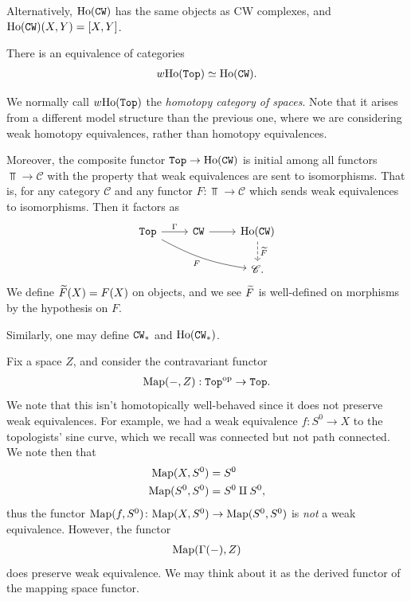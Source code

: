 \documentclass{article}[11pt]
\begin{document}
Alternatively, $\text{Ho}(\texttt{CW})$ has the same objects as CW complexes, and $\text{Ho}(\texttt{CW})(X,Y) = [X,Y]$.

\begin{exercise} There is an equivalence of categories
\begin{align*}
	w\text{Ho}(\texttt{Top}) \simeq \text{Ho}(\texttt{CW}).
\end{align*}
\end{exercise}

\begin{note} We normally call $w\text{Ho}(\texttt{Top})$ the \textit{homotopy category of spaces}. Note that it arises from a different model structure than the previous one, where we are considering weak homotopy equivalences, rather than homotopy equivalences.
\end{note}

Moreover, the composite functor $\texttt{Top} \to \text{Ho}(\texttt{CW})$ is initial among all functors $\Top \to \mathscr{C}$ with the property that weak equivalences are sent to isomorphisms. That is, for any category $\mathscr{C}$ and any functor $F: \Top \to \mathscr{C}$ which sends weak equivalences to isomorphisms. Then it factors as
\[
	\begin{tikzcd}
	\Top\rar["\Gamma"]\ar[drr,bend right=10,"F" below left] & \CW\rar & \Ho(\CW)\dar[dashed,"\til{F}" right]\\
	 &  & \mathscr{C}.
	\end{tikzcd}
\]
We define $\widetilde{F}(X) = F(X)$ on objects, and we see $\widetilde{F}$ is well-defined on morphisms by the hypothesis on $F$.

Similarly, one may define $\texttt{CW}_\ast$ and $\text{Ho}(\texttt{CW}_\ast)$.

Fix a space $Z$, and consider the contravariant functor
\begin{align*}
	\textup{Map}(-,Z) : \texttt{Top}^{\text{op}} \to \texttt{Top}.
\end{align*}
We note that this isn't homotopically well-behaved since it does not preserve weak equivalences. For example, we had a weak equivalence $f\colon S^0 \to X$ to the topologists' sine curve, which we recall was connected but not path connected. We note then that
\begin{align*}
	\textup{Map}(X,S^0) &= S^0 \\
	\textup{Map}(S^0, S^0) &= S^0 \amalg S^0,
\end{align*}
thus the functor $\textup{Map}(f,S^0) \colon \textup{Map}(X, S^0) \to \textup{Map}(S^0, S^0)$ is \textit{not} a weak equivalence. However, the functor
\begin{align*}
	\textup{Map}(\Gamma(-),Z)
\end{align*}
does preserve weak equivalence. We may think about it as the derived functor of the mapping space functor.
\end{document}
